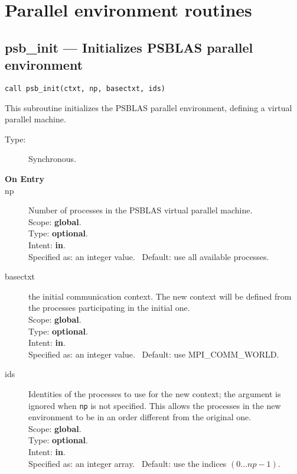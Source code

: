 

\section{Parallel environment routines}
\label{sec:parenv}

\clearpage\subsection{psb\_init --- Initializes PSBLAS parallel
  environment}

\begin{verbatim}
call psb_init(ctxt, np, basectxt, ids)
\end{verbatim}

This subroutine initializes the PSBLAS parallel environment, defining
a virtual parallel machine.
\begin{description}
\item[Type:] Synchronous.
\item[\bf  On Entry ]
\item[np] Number of processes in the PSBLAS virtual parallel machine.\\
Scope: {\bf global}.\\
Type: {\bf optional}.\\
Intent: {\bf in}.\\
Specified as: an integer value. \
Default: use all available processes.
\item[basectxt] the initial communication context. The new context
  will be defined from the processes participating in the initial one.\\
  Scope: {\bf global}.\\
Type: {\bf optional}.\\
Intent: {\bf in}.\\
Specified as: an integer value. \
Default: use MPI\_COMM\_WORLD.
\item[ids] Identities of the processes to use for the new context; the
  argument is ignored when \verb|np| is not specified. This allows the
  processes in the new environment to be in an order different from the
  original one.\\
  Scope: {\bf global}.\\
Type: {\bf optional}.\\
Intent: {\bf in}.\\
Specified as: an integer array. \
Default: use the indices $(0\dots np-1)$.  
\end{description}

